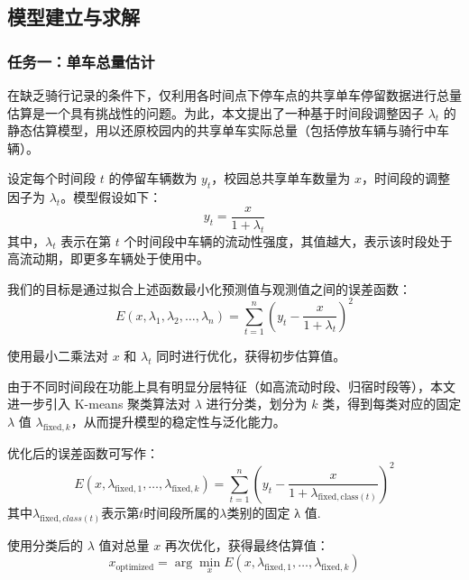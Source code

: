 \documentclass[withoutpreface,bwprint]{cumcmthesis}
\begin{document}
\subsection{模型建立与求解}
\subsubsection{任务一：单车总量估计}
    在缺乏骑行记录的条件下，仅利用各时间点下停车点的共享单车停留数据进行总量估算是一个具有挑战性的问题。为此，本文提出了一种基于时间段调整因子 $\lambda_t$ 的静态估算模型，用以还原校园内的共享单车实际总量（包括停放车辆与骑行中车辆）。\par

    设定每个时间段 $t$ 的停留车辆数为 $y_t$，校园总共享单车数量为 $x$，时间段的调整因子为 $\lambda_t$。模型假设如下：
    \begin{equation}
        y_t = \frac{x}{1 + \lambda_t}
    \end{equation}
    其中，\( \lambda_t \) 表示在第 \( t \) 个时间段中车辆的流动性强度，其值越大，表示该时段处于高流动期，即更多车辆处于使用中。\par
    
    我们的目标是通过拟合上述函数最小化预测值与观测值之间的误差函数：
    \begin{equation}
        E(x, \lambda_1, \lambda_2, \ldots, \lambda_n) = \sum_{t=1}^{n} \left( y_t - \frac{x}{1 + \lambda_t} \right)^2
    \end{equation}
    
    
    使用最小二乘法对 \( x \) 和 \( \lambda_t \) 同时进行优化，获得初步估算值。
    
    
    由于不同时间段在功能上具有明显分层特征（如高流动时段、归宿时段等），本文进一步引入 K-means 聚类算法对 \( \lambda \) 进行分类，划分为 \( k \) 类，得到每类对应的固定 \( \lambda \) 值 \( \lambda_{\text{fixed}, k} \)，从而提升模型的稳定性与泛化能力。
    
    优化后的误差函数可写作：
    \begin{equation}
        E(x, \lambda_{\text{fixed}, 1}, \dots, \lambda_{\text{fixed}, k}) = \sum_{t=1}^{n} \left( y_t - \frac{x}{1 + \lambda_{\text{fixed}, \text{class}(t)}} \right)^2
    \end{equation}
    其中$\lambda_{\text{fixed},class(t)}$表示第$t$时间段所属的$\lambda$类别的固定 λ 值.
    
    
    
    使用分类后的 \( \lambda \) 值对总量 \( x \) 再次优化，获得最终估算值：
    \begin{equation}
        x_{\text{optimized}} = \arg \min_{x} E(x, \lambda_{\text{fixed}, 1}, \dots, \lambda_{\text{fixed}, k})
    \end{equation}\par
\end{document}
